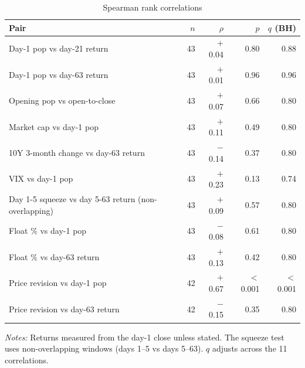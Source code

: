 \begin{table}[!htbp]\centering\small
\caption{Spearman rank correlations}\label{tab:corr}

\begin{threeparttable}
\begin{tabular}{lrrrr}
\toprule
Pair & $n$ & $\rho$ & $p$ & $q$ (BH) \\
\midrule
Day-1 pop vs day-21 return & 43 & $+$0.04 & 0.80 & 0.88 \\
Day-1 pop vs day-63 return & 43 & $+$0.01 & 0.96 & 0.96 \\
Opening pop vs open-to-close & 43 & $+$0.07 & 0.66 & 0.80 \\
Market cap vs day-1 pop & 43 & $+$0.11 & 0.49 & 0.80 \\
10Y 3-month change vs day-63 return & 43 & $-$0.14 & 0.37 & 0.80 \\
VIX vs day-1 pop & 43 & $+$0.23 & 0.13 & 0.74 \\
Day 1-5 squeeze vs day 5-63 return (non-overlapping) & 43 & $+$0.09 & 0.57 & 0.80 \\
Float \% vs day-1 pop & 43 & $-$0.08 & 0.61 & 0.80 \\
Float \% vs day-63 return & 43 & $+$0.13 & 0.42 & 0.80 \\
Price revision vs day-1 pop & 42 & $+$0.67 & $<$0.001 & $<$0.001 \\
Price revision vs day-63 return & 42 & $-$0.15 & 0.35 & 0.80 \\
\bottomrule
\end{tabular}
\begin{tablenotes}[flushleft]\footnotesize
\item \textit{Notes:} Returns measured from the day-1 close unless stated. The squeeze test uses non-overlapping windows (days 1--5 vs days 5--63). $q$ adjusts across the 11 correlations.
\end{tablenotes}
\end{threeparttable}

\end{table}
